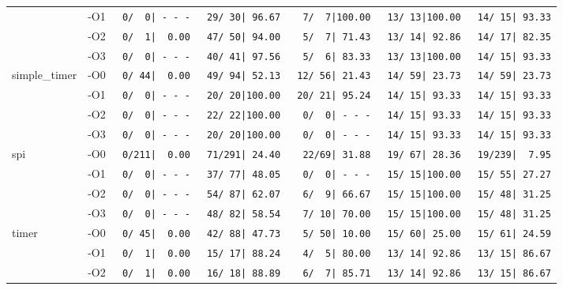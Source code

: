 \begin{tabular}{@{}llrrrrr@{}}
    & -O1 & \texttt{  0/~~0|~-~-~-} & \texttt{ 29/~30|~96.67} & \texttt{  7/~~7|100.00} & \texttt{ 13/~13|100.00} & \texttt{ 14/~15|~93.33} \\
    & -O2 & \texttt{  0/~~1|~~0.00} & \texttt{ 47/~50|~94.00} & \texttt{  5/~~7|~71.43} & \texttt{ 13/~14|~92.86} & \texttt{ 14/~17|~82.35} \\
    & -O3 & \texttt{  0/~~0|~-~-~-} & \texttt{ 40/~41|~97.56} & \texttt{  5/~~6|~83.33} & \texttt{ 13/~13|100.00} & \texttt{ 14/~15|~93.33} \\ \midrule
\multirow{4}{*}{simple\_timer}
    & -O0 & \texttt{  0/~44|~~0.00} & \texttt{ 49/~94|~52.13} & \texttt{ 12/~56|~21.43} & \texttt{ 14/~59|~23.73} & \texttt{ 14/~59|~23.73} \\
    & -O1 & \texttt{  0/~~0|~-~-~-} & \texttt{ 20/~20|100.00} & \texttt{ 20/~21|~95.24} & \texttt{ 14/~15|~93.33} & \texttt{ 14/~15|~93.33} \\
    & -O2 & \texttt{  0/~~0|~-~-~-} & \texttt{ 22/~22|100.00} & \texttt{  0/~~0|~-~-~-} & \texttt{ 14/~15|~93.33} & \texttt{ 14/~15|~93.33} \\
    & -O3 & \texttt{  0/~~0|~-~-~-} & \texttt{ 20/~20|100.00} & \texttt{  0/~~0|~-~-~-} & \texttt{ 14/~15|~93.33} & \texttt{ 14/~15|~93.33} \\ \midrule
\multirow{4}{*}{spi}
    & -O0 & \texttt{  0/211|~~0.00} & \texttt{ 71/291|~24.40} & \texttt{  22/69|~31.88} & \texttt{ 19/~67|~28.36} & \texttt{ 19/239|~~7.95} \\
    & -O1 & \texttt{  0/~~0|~-~-~-} & \texttt{ 37/~77|~48.05} & \texttt{  0/~~0|~-~-~-} & \texttt{ 15/~15|100.00} & \texttt{ 15/~55|~27.27} \\
    & -O2 & \texttt{  0/~~0|~-~-~-} & \texttt{ 54/~87|~62.07} & \texttt{  6/~~9|~66.67} & \texttt{ 15/~15|100.00} & \texttt{ 15/~48|~31.25} \\
    & -O3 & \texttt{  0/~~0|~-~-~-} & \texttt{ 48/~82|~58.54} & \texttt{  7/~10|~70.00} & \texttt{ 15/~15|100.00} & \texttt{ 15/~48|~31.25} \\ \midrule
\multirow{4}{*}{timer}
    & -O0 & \texttt{  0/~45|~~0.00} & \texttt{ 42/~88|~47.73} & \texttt{  5/~50|~10.00} & \texttt{ 15/~60|~25.00} & \texttt{ 15/~61|~24.59} \\
    & -O1 & \texttt{  0/~~1|~~0.00} & \texttt{ 15/~17|~88.24} & \texttt{  4/~~5|~80.00} & \texttt{ 13/~14|~92.86} & \texttt{ 13/~15|~86.67} \\
    & -O2 & \texttt{  0/~~1|~~0.00} & \texttt{ 16/~18|~88.89} & \texttt{  6/~~7|~85.71} & \texttt{ 13/~14|~92.86} & \texttt{ 13/~15|~86.67} \\

\end{tabular}
